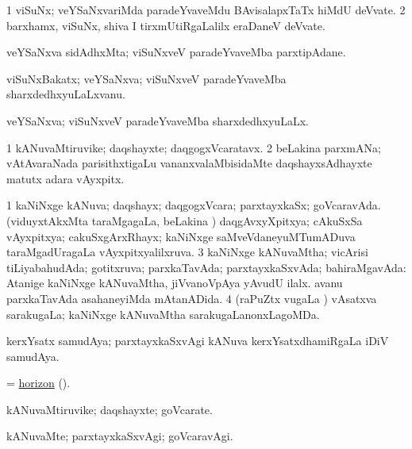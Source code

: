 \bentry
{} 
\gl{\nA}
\expl{}
\bmng
\bnum
\num{1} viSuNx; veYSaNxvariMda paradeYvaveMdu BAvisalapxTaTx hiMdU deVvate. 
\num{2} barxhamx, viSuNx, shiva I tirxmUtiRgaLalilx eraDaneV deVvate. 
\enum
\emng
\eentry

\bentry
{} 
\gl{\nA}
\expl{}
\bmng
 veYSaNxva sidAdhxMta; viSuNxveV paradeYvaveMba parxtipAdane. 
\emng
\eentry

\bentry
{} 
\gl{\nA}
\expl{}
\bmng
 viSuNxBakatx; veYSaNxva; viSuNxveV paradeYvaveMba sharxdedhxyuLaLxvanu. 
\emng
\eentry

\bentry 
{} 
\gl{\gu}
\expl{}
\bmng
 veYSaNxva; viSuNxveV paradeYvaveMba sharxdedhxyuLaLx. 
\emng
\eentry

\bentry
{} 
\gl{\nA}
\expl{}
\bmng
\bnum
\num{1} kANuvaMtiruvike; daqshayxte; daqgogxVcaratavx. 
\num{2} beLakina parxmANa; vAtAvaraNada parisithxtigaLu \mo vananxvalaMbisidaMte daqshayxsAdhayxte matutx adara vAyxpitx. 
\enum
\emng
\eentry

\bentry
{} 
\gl{\gu}
\expl{}
\bmng
\bnum
\num{1} kaNiNxge kANuva; daqshayx; daqgogxVcara; parxtayxkaSx; goVcaravAda. (viduyxtAkxMta taraMgagaLa, beLakina \vi) daqgAvxyXpitxya; cAkuSxSa vAyxpitxya; cakuSxgArxRhayx; kaNiNxge saMveVdaneyuMTumADuva taraMgadUragaLa vAyxpitxyalilxruva. 
\num{3} kaNiNxge kANuvaMtha; vicArisi tiLiyabahudAda; gotitxruva; parxkaTavAda; parxtayxkaSxvAda; bahiraMgavAda:  Atanige kaNiNxge kANuvaMtha, jiVvanoVpAya yAvudU ilalx.  avanu parxkaTavAda asahaneyiMda mAtanADida. 
\num{4} (raPuZtx \mo vugaLa \vi) vAsatxva sarakugaLa; kaNiNxge kANuvaMtha sarakugaLanonxLagoMDa. 
\enum
\emng

\noindent 
\gl{\pagu}
\expl{}
\bmng
  kerxYsatx samudAya; parxtayxkaSxvAgi kANuva kerxYsatxdhamiRgaLa iDiV samudAya. 
\emng
\eentry

\bentry
{}
\gl{\nA}
\expl{}
\bmng
 = \hyperref{kandict_h.pdf}{H}{horizon pagu(6)}{horizon} (\pagu {}). 
\emng
\eentry

\bentry
{} 
\gl{\nA}
\expl{}
\bmng
 kANuvaMtiruvike; daqshayxte; goVcarate. 
\emng
\eentry

\bentry 
{} 
\gl{\kirxvi}
\expl{}
\bmng
 kANuvaMte; parxtayxkaSxvAgi; goVcaravAgi. 
\emng
\eentry

